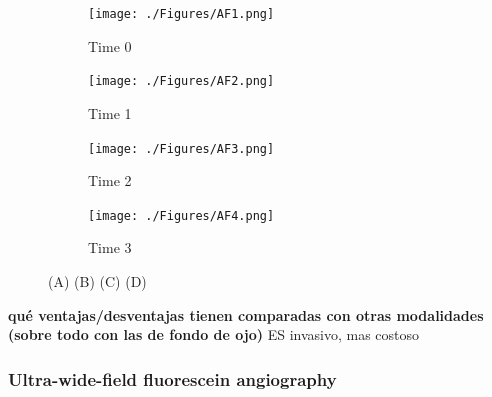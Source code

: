\begin{figure}[H]
	\centering
	\begin{subfigure}[b]{0.23\textwidth}
        \texttt{[image: ./Figures/AF1.png]}
        \caption{Time 0}
        \label{fig:af1}
    \end{subfigure}
	\begin{subfigure}[b]{0.23\textwidth}
        \texttt{[image: ./Figures/AF2.png]}
        \caption{Time 1}
        \label{fig:af2}
    \end{subfigure}
	\begin{subfigure}[b]{0.23\textwidth}
        \texttt{[image: ./Figures/AF3.png]}
        \caption{Time 2}
        \label{fig:af3}
    \end{subfigure}
    	\begin{subfigure}[b]{0.23\textwidth}
        \texttt{[image: ./Figures/AF4.png]}
        \caption{Time 3}
        \label{fig:af4}
    \end{subfigure}
	\label{fig:retina}
	\caption{(A) (B) (C) (D)}
\end{figure}


\textbf{qué ventajas/desventajas tienen comparadas con otras modalidades (sobre todo con las de fondo de ojo)}
ES invasivo, mas costoso

\subsubsection{Ultra-wide-field fluorescein angiography }

